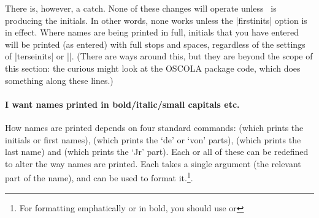 There is, however, a catch. None of these changes will operate unless \biblatex\ is producing the initials. In other words, none works unless the |firstinits| option is in effect. Where names are being printed in full, initials that you have entered will be printed (as entered) with full stops and spaces, regardless of the settings of |terseinits| or |\bibinitperiod|. (There are ways around this, but they are beyond the scope of this section: the curious might look at the OSCOLA package code, which does something along these lines.)

\paragraph{I want names printed in bold/italic/small capitals etc.} How names are printed depends on four standard commands:  (which prints the initials or first names),  (which prints the `de' or `von' parts),  (which prints the last name) and  (which prints the `Jr' part). Each or all of these can be redefined to alter the way names are printed. Each takes a single argument (the relevant part of the name), and can be used to format it.\footnote{For formatting emphatically or in bold, you should use  or }.

